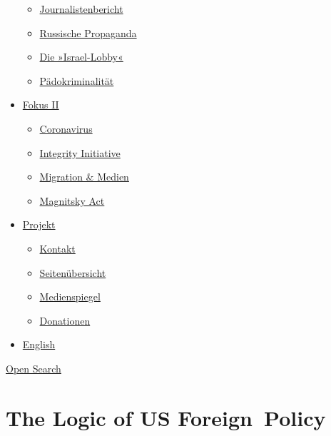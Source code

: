 \begin{itemize}
  \begin{itemize}
  \tightlist
  \item
    \href{https://swprs.org/bericht-eines-journalisten/}{Journalistenbericht}
  \item
    \href{https://swprs.org/russische-propaganda/}{Russische Propaganda}
  \item
    \href{https://swprs.org/die-israel-lobby-fakten-und-mythen/}{Die
    »Israel-Lobby«}
  \item
    \href{https://swprs.org/geopolitik-und-paedokriminalitaet/}{Pädokriminalität}
  \end{itemize}
\item
  \href{https://swprs.org/migration-und-medien/}{Fokus II}

  \begin{itemize}
  \tightlist
  \item
    \href{https://swprs.org/covid-19-hinweis-ii/}{Coronavirus}
  \item
    \href{https://swprs.org/die-integrity-initiative/}{Integrity
    Initiative}
  \item
    \href{https://swprs.org/migration-und-medien/}{Migration \& Medien}
  \item
    \href{https://swprs.org/der-fall-magnitsky/}{Magnitsky Act}
  \end{itemize}
\item
  \href{https://swprs.org/kontakt/}{Projekt}

  \begin{itemize}
  \tightlist
  \item
    \href{https://swprs.org/kontakt/}{Kontakt}
  \item
    \href{https://swprs.org/uebersicht/}{Seitenübersicht}
  \item
    \href{https://swprs.org/medienspiegel/}{Medienspiegel}
  \item
    \href{https://swprs.org/donationen/}{Donationen}
  \end{itemize}
\item
  \href{https://swprs.org/contact/}{English}
\end{itemize}

\protect\hyperlink{}{Open Search}

\hypertarget{the-logic-of-us-foreign-policy}{%
\section{The Logic of US
Foreign~Policy}\label{the-logic-of-us-foreign-policy}}

